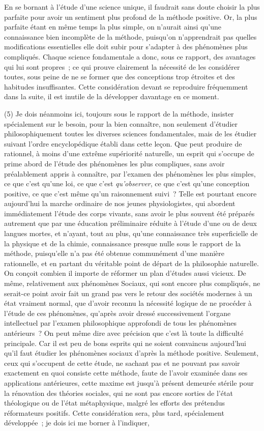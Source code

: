 \documentclass[french,twoside]{book} %
\begin{document}
En se bornant à l’étude d’une science unique, il faudrait sans doute choisir la plus parfaite pour avoir un sentiment plus profond de la méthode positive. Or, la plus parfaite étant en même temps la plus simple, on n’aurait ainsi qu’une connaissance bien incomplète de la méthode, puisqu’on n’apprendrait pas quelles modifications essentielles elle doit subir pour s’adapter à des phénomènes plus compliqués. Chaque science fondamentale a donc, sous ce rapport, des avantages qui lui sont propres ; ce qui prouve clairement la nécessité de les considérer toutes, sous peine de ne se former que des conceptions trop étroites et des habitudes insuffisantes. Cette considération devant se reproduire fréquemment dans la suite, il est inutile de la développer davantage en ce moment.\par
(5) Je dois néanmoins ici, toujours sous le rapport de la méthode, insister spécialement sur le besoin, pour la bien connaître, non seulement d’étudier philosophiquement toutes les diverses sciences fondamentales, mais de les étudier suivant l’ordre encyclopédique établi dans cette leçon. Que peut produire de rationnel, à moins d’une extrême supériorité naturelle, un esprit qui s’occupe de prime abord de l’étude des phénomènes les plus compliques, sans avoir préalablement appris à connaître, par l’examen des phénomènes les plus simples, ce que c’est qu’une loi, ce que c’est {\itshape qu’observer}, ce que c’est qu’une conception positive, ce que c’est même qu’un raisonnement suivi ? Telle est pourtant encore aujourd’hui la marche ordinaire de nos jeunes physiologistes, qui abordent immédiatement l’étude des corps vivants, sans avoir le plus souvent été préparés autrement que par une éducation préliminaire réduite à l’étude d’une ou de deux langues mortes, et n’ayant, tout au plus, qu’une connaissance très superficielle de la physique et de la chimie, connaissance presque nulle sous le rapport de la méthode, puisqu’elle n’a pas été obtenue communément d’une manière rationnelle, et en partant du véritable point de départ de la philosophie naturelle. On conçoit combien il importe de réformer un plan d’études aussi vicieux. De même, relativement aux phénomènes Sociaux, qui sont encore plus compliqués, ne serait-ce point avoir fait un grand pas vers le retour des sociétés modernes à un état vraiment normal, que d’avoir reconnu la nécessité logique de ne procéder à l’étude de ces phénomènes, qu’après avoir dressé successivement l’organe intellectuel par l’examen philosophique approfondi de tous les phénomènes antérieurs ? On peut même dire avec précision que c’est là toute la difficulté principale. Car il est peu de bons esprits qui ne soient convaincus aujourd’hui qu’il faut étudier les phénomènes sociaux d’après la méthode positive. Seulement, ceux qui s’occupent de cette étude, ne sachant pas et ne pouvant pas savoir exactement en quoi consiste cette méthode, faute de l’avoir examinée dans ses applications antérieures, cette maxime est jusqu’à présent demeurée stérile pour la rénovation des théories sociales, qui ne sont pas encore sorties de l’état théologique ou de l’état métaphysique, malgré les efforts des prétendus réformateurs positifs. Cette considération sera, plus tard, spécialement développée ; je dois ici me borner à l’indiquer, 
\end{document}
